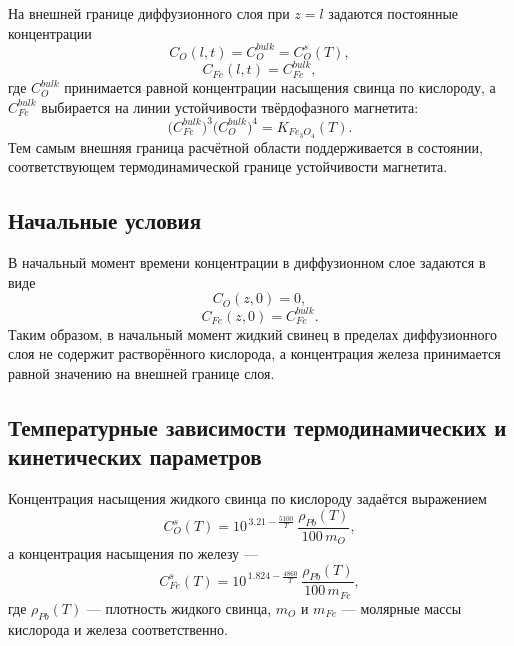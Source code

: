 \documentclass[12pt, a4paper]{article}
\begin{document}
На внешней границе диффузионного слоя при $z=l$ задаются постоянные концентрации
\begin{equation}
C_O(l,t)=C_O^{bulk}=C_O^{s}(T),
\label{eq:bc_oxygen_bulk}
\end{equation}
\begin{equation}
C_{Fe}(l,t)=C_{Fe}^{bulk},
\label{eq:bc_iron_bulk}
\end{equation}
где $C_O^{bulk}$ принимается равной концентрации насыщения свинца по кислороду, а $C_{Fe}^{bulk}$ выбирается на линии устойчивости твёрдофазного магнетита:
\begin{equation}
\bigl(C_{Fe}^{bulk}\bigr)^3\bigl(C_O^{bulk}\bigr)^4 = K_{Fe_3O_4}(T).
\label{eq:bulk_stability_line}
\end{equation}
Тем самым внешняя граница расчётной области поддерживается в состоянии, соответствующем термодинамической границе устойчивости магнетита.

\subsection*{Начальные условия}

В начальный момент времени концентрации в диффузионном слое задаются в виде
\begin{equation}
C_O(z,0)=0,
\label{eq:init_oxygen}
\end{equation}
\begin{equation}
C_{Fe}(z,0)=C_{Fe}^{bulk}.
\label{eq:init_iron}
\end{equation}
Таким образом, в начальный момент жидкий свинец в пределах диффузионного слоя не содержит растворённого кислорода, а концентрация железа принимается равной значению на внешней границе слоя.

\subsection*{Температурные зависимости термодинамических и кинетических параметров}

Концентрация насыщения жидкого свинца по кислороду задаётся выражением
\begin{equation}
C_O^{s}(T)=10^{\,3.21-\frac{5100}{T}}\,
\frac{\rho_{Pb}(T)}{100\,m_O},
\label{eq:oxygen_saturation}
\end{equation}
а концентрация насыщения по железу ---
\begin{equation}
C_{Fe}^{s}(T)=10^{\,1.824-\frac{4860}{T}}\,
\frac{\rho_{Pb}(T)}{100\,m_{Fe}},
\label{eq:iron_saturation}
\end{equation}
где $\rho_{Pb}(T)$ --- плотность жидкого свинца, $m_O$ и $m_{Fe}$ --- молярные массы кислорода и железа соответственно.
\end{document}
